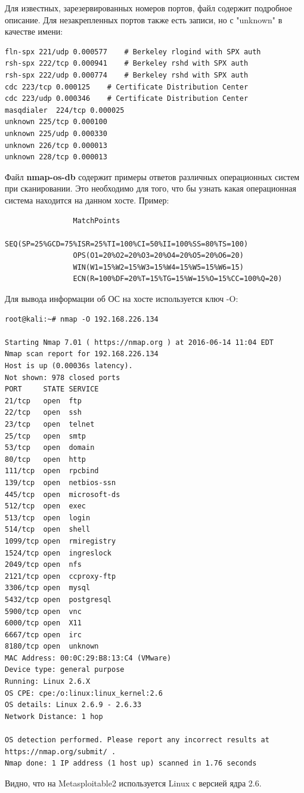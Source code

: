 \documentclass[10pt,a4paper,titlepage]{article}
\begin{document}
Для известных, зарезервированных номеров портов, файл содержит подробное описание. Для незакрепленных портов также есть записи, но с "unknown" в качестве имени:

\begin{verbatim}
fln-spx	221/udp	0.000577	# Berkeley rlogind with SPX auth
rsh-spx	222/tcp	0.000941	# Berkeley rshd with SPX auth
rsh-spx	222/udp	0.000774	# Berkeley rshd with SPX auth
cdc	223/tcp	0.000125	# Certificate Distribution Center
cdc	223/udp	0.000346	# Certificate Distribution Center
masqdialer	224/tcp	0.000025
unknown	225/tcp	0.000100
unknown	225/udp	0.000330
unknown	226/tcp	0.000013
unknown	228/tcp	0.000013
\end{verbatim}
			
Файл  \textbf{nmap-os-db} содержит примеры ответов различных операционных систем при сканировании. Это необходимо для того, что бы узнать какая операционная система находится на данном хосте. Пример:

			\begin{verbatim}
				MatchPoints
				SEQ(SP=25%GCD=75%ISR=25%TI=100%CI=50%II=100%SS=80%TS=100)
				OPS(O1=20%O2=20%O3=20%O4=20%O5=20%O6=20)
				WIN(W1=15%W2=15%W3=15%W4=15%W5=15%W6=15)
				ECN(R=100%DF=20%T=15%TG=15%W=15%O=15%CC=100%Q=20)
			\end{verbatim}
			
			Для вывода информации об ОС на хосте используется ключ -O:
			
			\begin{verbatim}
root@kali:~# nmap -O 192.168.226.134

Starting Nmap 7.01 ( https://nmap.org ) at 2016-06-14 11:04 EDT
Nmap scan report for 192.168.226.134
Host is up (0.00036s latency).
Not shown: 978 closed ports
PORT     STATE SERVICE
21/tcp   open  ftp
22/tcp   open  ssh
23/tcp   open  telnet
25/tcp   open  smtp
53/tcp   open  domain
80/tcp   open  http
111/tcp  open  rpcbind
139/tcp  open  netbios-ssn
445/tcp  open  microsoft-ds
512/tcp  open  exec
513/tcp  open  login
514/tcp  open  shell
1099/tcp open  rmiregistry
1524/tcp open  ingreslock
2049/tcp open  nfs
2121/tcp open  ccproxy-ftp
3306/tcp open  mysql
5432/tcp open  postgresql
5900/tcp open  vnc
6000/tcp open  X11
6667/tcp open  irc
8180/tcp open  unknown
MAC Address: 00:0C:29:B8:13:C4 (VMware)
Device type: general purpose
Running: Linux 2.6.X
OS CPE: cpe:/o:linux:linux_kernel:2.6
OS details: Linux 2.6.9 - 2.6.33
Network Distance: 1 hop

OS detection performed. Please report any incorrect results at https://nmap.org/submit/ .
Nmap done: 1 IP address (1 host up) scanned in 1.76 seconds

			\end{verbatim}
Видно, что на Metasploitable2 используется Linux с версией ядра 2.6.
\end{document}

